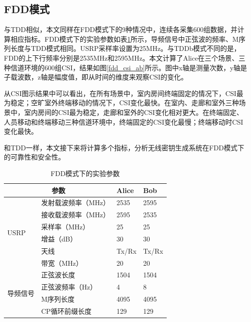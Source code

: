 \documentclass[master]{seuthesis} %
\begin{document}
\begin{Main}
\section{FDD模式}

与TDD相似，本文同样在FDD模式下的9种情况中，连续各采集600组数据，并计算相应指标。FDD模式下的实验参数如表\ref{fdd-exp-args}所示，导频信号中正弦波的频率、M序列长度与TDD模式相同。USRP采样率设置为25MHz。与TDDb模式不同的是，FDD的上下行频率分别是2535MHz和2595MHz。本文计算了Alice在三个场景、三种信道环境的600组CSI，结果如图\ref{fdd_csi_ab}所示。图中x轴是测量次数，y轴是子载波数，z轴是幅度值，即从时间的维度来观察CSI的变化。

从CSI图示结果中可以看出，在所有场景中，室内房间终端固定的情况下，CSI最为稳定；空旷室外终端移动的情况下，CSI变化最快。在室内、走廊和室外三种场景中，室内房间的CSI最为稳定，走廊和室外的CSI变化相对更大。在终端固定、人员移动和终端移动三种信道环境中，终端固定的CSI变化最慢；终端移动时CSI变化最快。

和TDD一样，本文接下来将计算多个指标，分析无线密钥生成系统在FDD模式下的可靠性和安全性。

\begin{table}[]
    \centering
    \begin{tabular}{|l|l|l|l|}
    \hline
    \multicolumn{2}{|c|}{参数} & Alice & Bob \\ \hline
    \multirow{6}{*}{USRP} & 发射载波频率（MHz） & 2535 & 2595 \\ \cline{2-4} 
     & 接收载波频率（MHz） & 2595 & 2535 \\ \cline{2-4} 
     & 采样率（MHz） & 25 & 25 \\ \cline{2-4} 
     & 增益（dB） & 30 & 30 \\ \cline{2-4} 
     & 天线 & Tx/Rx & Tx/Rx \\ \cline{2-4} 
     & 带宽（MHz） & 20 & 20 \\ \hline
    \multirow{4}{*}{导频信号} & 正弦波长度 & 1504 & 1504 \\ \cline{2-4} 
     & 正弦波频率（Hz） & 4 & 8 \\ \cline{2-4} 
     & M序列长度 & 4095 & 4095 \\ \cline{2-4} 
     & CP循环前缀长度 & 129 & 129 \\ \hline
    \end{tabular}
    \caption{FDD模式下的实验参数
    \label{fdd-exp-args}}
\end{table}


\end{Main}
\end{document}
